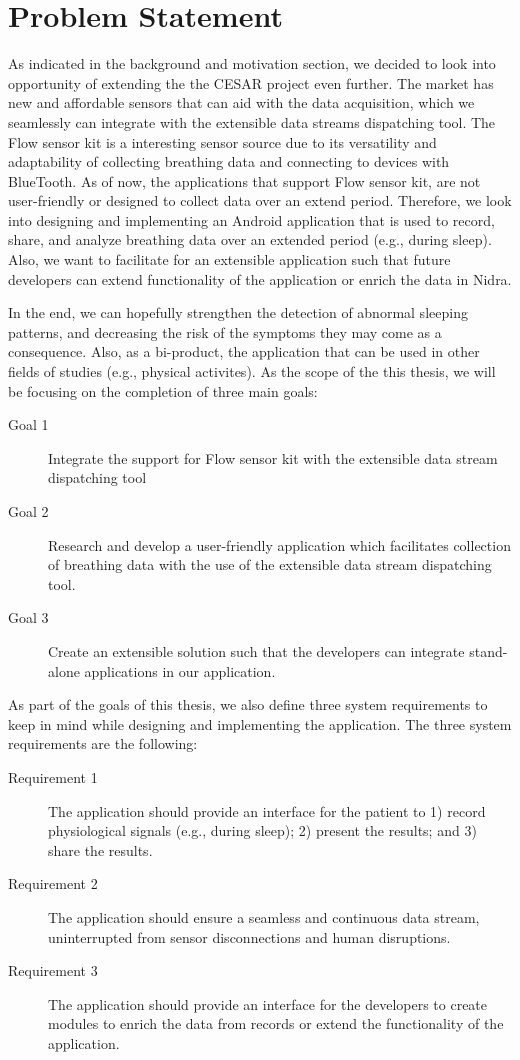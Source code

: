 \section{Problem Statement}

As indicated in the background and motivation section, we decided to look into opportunity of extending the the CESAR project even further. The market has new and affordable sensors that can aid with the data acquisition, which we seamlessly can integrate with the extensible data streams dispatching tool. The Flow sensor kit is a interesting sensor source due to its versatility and adaptability of collecting breathing data and connecting to devices with BlueTooth. As of now, the applications that support Flow sensor kit, are not user-friendly or designed to collect data over an extend period. Therefore, we look into designing and implementing an Android application that is used to record, share, and analyze breathing data over an extended period (e.g., during sleep). Also, we want to facilitate for an extensible application such that future developers can extend functionality of the application or enrich the data in Nidra. 

In the end, we can hopefully strengthen the detection of abnormal sleeping patterns, and decreasing the risk of the symptoms they may come as a consequence. Also, as a bi-product, the application that can be used in other fields of studies (e.g., physical activites). As the scope of the this thesis, we will be focusing on the completion of three main goals:

\begin{description}
    \item[Goal 1] Integrate the support for Flow sensor kit with the extensible data stream dispatching tool
    \item[Goal 2] Research and develop a user-friendly application which facilitates collection of breathing data with the use of the extensible data stream dispatching tool.
    \item[Goal 3] Create an extensible solution such that the developers can integrate stand-alone applications in our application. 
\end{description}

As part of the goals of this thesis, we also define three system requirements to keep in mind while designing and implementing the application. The three system requirements are the following: 

\begin{description}
    \item[Requirement 1] The application should provide an interface for the patient to 1) record physiological signals (e.g., during sleep); 2) present the results; and 3) share the results.
    \item[Requirement 2] The application should ensure a seamless and continuous data stream, uninterrupted from sensor disconnections and human disruptions.
    \item[Requirement 3] The application should provide an interface for the developers to create modules to enrich the data from records or extend the functionality of the application.
\end{description}


